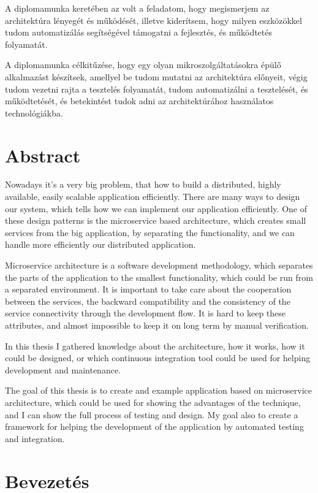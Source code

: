 \documentclass[11pt,magyar,a4paper,twoside,]{report}
\begin{document}
A diplomamunka keretében az volt a feladatom, hogy megismerjem az
architektúra lényegét és működését, illetve kiderítsem, hogy milyen
eszközökkel tudom automatizálás segítségével támogatni a fejlesztés, és
működtetés folyamatát.

A diplomamunka célkitűzése, hogy egy olyan mikroszolgáltatásokra épülő
alkalmazást készítsek, amellyel be tudom mutatni az architektúra
előnyeit, végig tudom vezetni rajta a tesztelés folyamatát, tudom
automatizálni a tesztelését, és működtetését, és betekintést tudok adni
az architektúrához használatos technológiákba.

\chapter*{Abstract}\label{abstract}

Nowadays it's a very big problem, that how to build a distributed,
highly available, easily scalable application efficiently. There are
many ways to design our system, which tells how we can implement our
application efficiently. One of these design patterns is the
microservice based architecture, which creates small services from the
big application, by separating the functionality, and we can handle more
efficiently our distributed application.

Microservice architecture is a software development methodology, which
separates the parts of the application to the smallest functionality,
which could be run from a separated environment. It is important to take
care about the cooperation between the services, the backward
compatibility and the consistency of the service connectivity through
the development flow. It is hard to keep these attributes, and almost
impossible to keep it on long term by manual verification.

In this thesis I gathered knowledge about the architecture, how it
works, how it could be designed, or which continuous integration tool
could be used for helping development and maintenance.

The goal of this thesis is to create and example application based on
microservice architecture, which could be used for showing the
advantages of the technique, and I can show the full process of testing
and design. My goal also to create a framework for helping the
development of the application by automated testing and integration.

\chapter{Bevezetés}\label{bevezetuxe9s}
\end{document}
